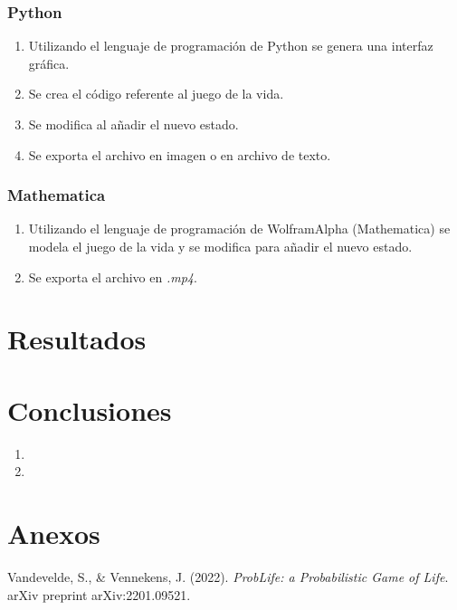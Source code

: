 \documentclass[conference]{IEEEtran}
\begin{document}
    \subsubsection{Python}
        \begin{enumerate}
            \item Utilizando el lenguaje de programación de Python se genera una interfaz gráfica.
            \item Se crea el código referente al juego de la vida.
            \item Se modifica al añadir el nuevo estado.
            \item Se exporta el archivo en imagen o en archivo de texto.
        \end{enumerate}
        
        
	\subsubsection{Mathematica}
        \begin{enumerate}
            \item Utilizando el lenguaje de programación de WolframAlpha (Mathematica) se modela el juego de la vida y se modifica para añadir el nuevo estado.
            \item Se exporta el archivo en \textit{.mp4}.
        \end{enumerate}        
        
        
        
        
\section{Resultados}
    
\section{Conclusiones}
\begin{enumerate}
    \item 
    \item 
\end{enumerate}

\section{Anexos}
    
    
    
    
\begin{thebibliography}{00}
 Vandevelde, S., \& Vennekens, J. (2022). \textit{ProbLife: a Probabilistic Game of Life}. arXiv preprint arXiv:2201.09521.
\end{thebibliography}
\end{document}
